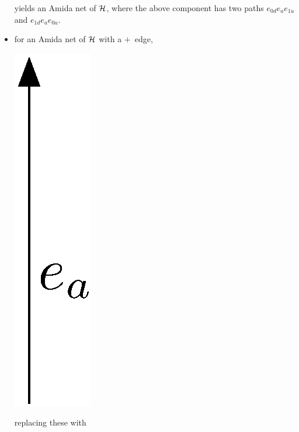 \begin{definition}
\begin{itemize}
\begin{center}
	\end{center}
       yields an Amida net of $\mathcal{H}$,
       where the above component has two paths $e_{0d} e_a e_{1u}$
       and $e_{1d} e_a e_{0u}$.
 \item for an Amida net of $\mathcal{H}$ with a $+$~edge,
	\begin{center}
	 \includegraphics[scale=0.4]{oneedge.eps}
	\end{center}
       replacing these with
	\begin{center}

\end{center}
\end{itemize}
\end{definition}
